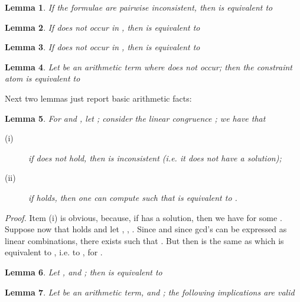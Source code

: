 \documentclass[11pt,a4paper]{article}
\newtheorem{lemma}{Lemma}
\begin{document}
{\begin{lemma}\label{lem:pairwise} If the formulae  are pairwise inconsistent, then 
  is equivalent to
 
\end{lemma}

\begin{lemma}\label{lem:independent}
 If  does not occur in , then  is equivalent to
 
\end{lemma}

\begin{lemma}\label{lem:unique}
 If  does not occur in , then  is equivalent to
 
\end{lemma}

\begin{lemma}\label{lem:c}
 Let  be an arithmetic term where  does not occur; then the constraint atom   is equivalent to
 
\end{lemma}

Next two lemmas just report basic arithmetic facts:


\begin{lemma}\label{lem:congruence}
 For  and , let ; consider the linear congruence  ; we have that
 \begin{description}
  \item[{\rm (i)}] if  does not hold, then  is inconsistent (i.e. it does not have a solution);
  \item[{\rm (ii)}] if  holds, then one can compute  such that
  is equivalent to .
 \end{description}
\end{lemma}

\noindent
\textit{Proof.}
Item (i) is obvious, because, if 
 has a solution, then we have  for some . Suppose now that   holds and
 let , , . Since  and since gcd's can be expressed as linear combinations, there exists  such that .
  But then   is the same as 
  which is equivalent to , i.e. to , for .
 



\begin{lemma}\label{lem:lcm}
Let ,  and ; then
 is equivalent to

\end{lemma}



\begin{lemma}\label{lem:impl}
 Let  be an arithmetic term,  and ; the following implications are valid
 

\end{lemma}}
\end{document}
